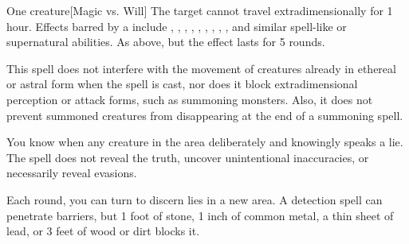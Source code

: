\begin{spellheader}
    \spellrng{\rngmed}
\end{spellheader}
\begin{spelleffects}
    \begin{spelltarget}{One creature}[Magic vs. Will]
        \spellsuccess  The target cannot travel extradimensionally for 1 hour. Effects barred by a  include , , , , , , , , , and similar spell-like or supernatural abilities.
        \spellfailure As above, but the effect lasts for 5 rounds.
    \end{spelltarget}
\end{spelleffects}
\begin{spellfooter}
    \spellnotes This spell does not interfere with the movement of creatures already in ethereal or astral form when the spell is cast, nor does it block extradimensional perception or attack forms, such as summoning monsters. Also, it does not prevent summoned creatures from disappearing at the end of a summoning spell.
\end{spellfooter}

\begin{spellheader}
\end{spellheader}
\begin{spelleffects}
    \spelleffect You know when any creature in the area deliberately and knowingly speaks a lie. The spell does not reveal the truth, uncover unintentional inaccuracies, or necessarily reveal evasions.
\end{spelleffects}
\begin{spellfooter}
    \spellnotes Each round, you can turn to discern lies in a new area. A detection spell can penetrate barriers, but 1 foot of stone, 1 inch of common metal, a thin sheet of lead, or 3 feet of wood or dirt blocks it.
\end{spellfooter}


